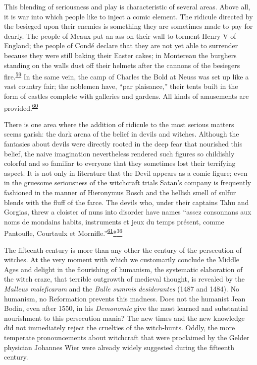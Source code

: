 This blending of seriousness and play is characteristic of several
areas. Above all, it is war into which people like to inject a comic
element. The ridicule directed by the besieged upon their enemies is
something they are sometimes made to pay for dearly. The
peo\protect\hypertarget{18_Chapter_Eleven__THE_FORMS_OF_THO.xhtmlux5cux23page_286}{}{}ple
of Meaux put an ass on their wall to torment Henry V of England; the
people of Condé declare that they are not yet able to surrender because
they were still baking their Easter cakes; in Montereau the burghers
standing on the walls dust off their helmets after the cannons of the
besiegers
fire.\textsuperscript{\protect\hypertarget{18_Chapter_Eleven__THE_FORMS_OF_THO.xhtmlux5cux23id_515}{\protect\hyperlink{23_NOTES.xhtmlux5cux23id_516}{59}}}
In the same vein, the camp of Charles the Bold at Neuss was set up like
a vast country fair; the noblemen have, ``par plaisance,'' their tents
built in the form of castles complete with galleries and gardens. All
kinds of amusements are
provided.\textsuperscript{\protect\hypertarget{18_Chapter_Eleven__THE_FORMS_OF_THO.xhtmlux5cux23id_513}{\protect\hyperlink{23_NOTES.xhtmlux5cux23id_514}{60}}}

There is one area where the addition of ridicule to the most serious
matters seems garish: the dark arena of the belief in devils and
witches. Although the fantasies about devils were directly rooted in the
deep fear that nourished this belief, the naive imagination nevertheless
rendered such figures so childishly colorful and so familiar to everyone
that they sometimes lost their terrifying aspect. It is not only in
literature that the Devil appears as a comic figure; even in the
gruesome seriousness of the witchcraft trials Satan's company is
frequently fashioned in the manner of Hieronymus Bosch and the hellish
smell of sulfur blends with the fluff of the farce. The devils who,
under their captains Tahu and Gorgias, threw a cloister of nuns into
disorder have names ``assez consonnans aux noms de mondains habits,
instruments et jeux du temps présent, comme Pantoufle, Courtaulx et
Mornifle.''\textsuperscript{\protect\hypertarget{18_Chapter_Eleven__THE_FORMS_OF_THO.xhtmlux5cux23id_511}{\protect\hyperlink{23_NOTES.xhtmlux5cux23id_512}{61}}}\protect\hypertarget{18_Chapter_Eleven__THE_FORMS_OF_THO.xhtmlux5cux23id_2633}{\protect\hyperlink{23_NOTES.xhtmlux5cux23id_2634}{*\textsuperscript{36}}}

The fifteenth century is more than any other the century of the
persecution of witches. At the very moment with which we customarily
conclude the Middle Ages and delight in the flourishing of humanism, the
systematic elaboration of the witch craze, that terrible outgrowth of
medieval thought, is revealed by the \emph{Malleus maleficarum} and the
\emph{Bulle summis desiderantes} (1487 and 1484). No humanism, no
Reformation prevents this madness. Does not the humanist Jean Bodin,
even after 1550, in his \emph{Demonomie} give the most learned and
substantial nourishment to this persecution mania? The new times and the
new knowledge did not immediately reject the cruelties of the
witch-hunts. Oddly, the more temperate pronouncements about witchcraft
that were proclaimed by the Gelder physician Johannes Wier were already
widely suggested during the fifteenth century.

